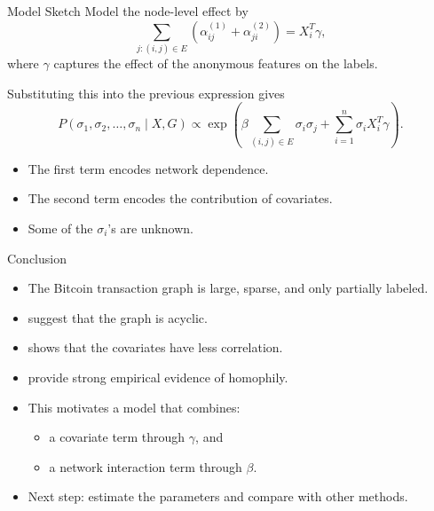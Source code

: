 \documentclass[aspectratio=169]{beamer}
\begin{document}
\begin{frame}{Model Sketch}
\small
Model the node-level effect by
\[
     \sum_{j:(i,j)\in E} (\alpha^{(1)}_{ij}+\alpha^{(2)}_{ji}) = X_i^T\gamma,
\]
where $\gamma$ captures the effect of the anonymous features on the labels.

\vspace{0.2cm}
Substituting this into the previous expression gives
\[
    P(\sigma_1,\sigma_2,\ldots,\sigma_n \mid X,G)
    \propto
    \exp\!\left(
        \beta \sum_{(i,j)\in E} \sigma_i\sigma_j
        + \sum_{i=1}^n \sigma_i X_i^T\gamma
    \right).
\]

\begin{itemize}
    \item The first term encodes \alert{network dependence}.
    \item The second term encodes the contribution of \alert{covariates}.
    \item Some of the $\sigma_i$'s are unknown.
\end{itemize}
\end{frame}

\begin{frame}{Conclusion}
\begin{itemize}
    \item The Bitcoin transaction graph is large, sparse, and only partially labeled.
    \item {} suggest that the graph is acyclic.
    \item {} shows that the covariates have less correlation.
    \item {} provide strong empirical evidence of homophily.
    \item This motivates a model that combines:
    \begin{itemize}
        \item a covariate term through $\gamma$, and
        \item a network interaction term through $\beta$.
    \end{itemize}
    \item Next step: estimate the parameters and compare with other methods.
\end{itemize}
\end{frame}
\end{document}
